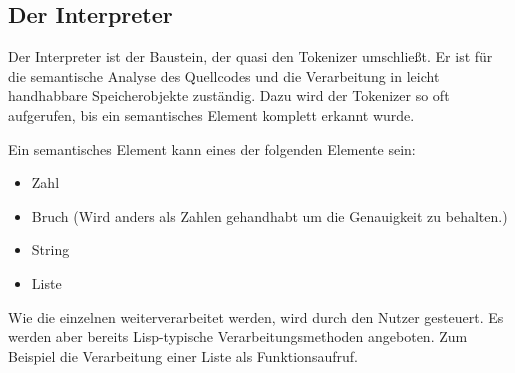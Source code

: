 \subsection{Der Interpreter}

Der Interpreter ist der Baustein, der quasi den Tokenizer umschließt.
Er ist für die semantische Analyse des Quellcodes und die Verarbeitung in
leicht handhabbare Speicherobjekte zuständig. Dazu wird der Tokenizer so oft
aufgerufen, bis ein semantisches Element komplett erkannt wurde.

Ein semantisches Element kann eines der folgenden Elemente sein:

\begin{itemize}
\item{Zahl}
\item{Bruch (Wird anders als Zahlen gehandhabt um die Genauigkeit zu behalten.)}
\item{String}
\item{Liste}
\end{itemize}

Wie die einzelnen weiterverarbeitet werden, wird durch den Nutzer gesteuert.
Es werden aber bereits Lisp-typische Verarbeitungsmethoden angeboten.
Zum Beispiel die Verarbeitung einer Liste als Funktionsaufruf.

